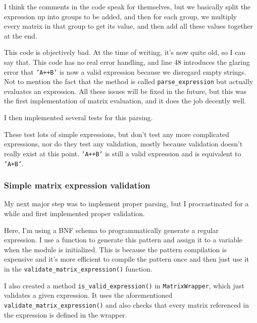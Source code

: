 \documentclass[../main.tex]{subfiles}
\begin{document}

I think the comments in the code speak for themselves, but we basically split the expression up into groups to be added, and then for each group, we multiply every matrix in that group to get its value, and then add all these values together at the end.

This code is objectively bad. At the time of writing, it's now quite old, so I can say that. This code has no real error handling, and line 48 introduces the glaring error that \texttt{'A++B'} is now a valid expression because we disregard empty strings. Not to mention the fact that the method is called \texttt{parse\_expression} but actually evaluates an expression. All these issues will be fixed in the future, but this was the first implementation of matrix evaluation, and it does the job decently well.

I then implemented several tests for this parsing.


These test lots of simple expressions, but don't test any more complicated expressions, nor do they test any validation, mostly because validation doesn't really exist at this point. \texttt{'A++B'} is still a valid expression and is equivalent to \texttt{'A+B'}.

\subsubsection{Simple matrix expression validation}

My next major step was to implement proper parsing, but I procrastinated for a while and first implemented proper validation.


Here, I'm using a BNF schema to programmatically generate a regular expression. I use a function to generate this pattern and assign it to a variable when the module is initialized. This is because the pattern compilation is expensive and it's more efficient to compile the pattern once and then just use it in the \texttt{validate\_matrix\_expression()} function.

I also created a method \texttt{is\_valid\_expression()} in \texttt{MatrixWrapper}, which just validates a given expression. It uses the aforementioned \texttt{validate\_matrix\_expression()} and also checks that every matrix referenced in the expression is defined in the wrapper.
\end{document}
